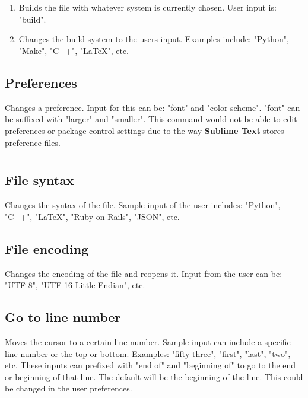 \documentclass[11pt, oneside]{article}
\begin{document}
\section{}

	\begin{enumerate}
	\item {}
	Builds the file with whatever system is currently chosen. User input is: "build".

	\item {}
	Changes the build system to the users input. Examples include: "Python", "Make", "C++", "\LaTeX", etc.
	\end{enumerate}

\subsection{Preferences}
	Changes a preference. Input for this can be: "font" and  "color scheme". "font" can be suffixed with "larger" and "smaller". This command would not be able to edit preferences or package control settings due to the way \textbf{Sublime Text} stores preference files. 

\section{}

	\subsection{File syntax}
	Changes the syntax of the file. Sample input of the user includes: "Python", "C++", "\LaTeX", "Ruby on Rails", "JSON", etc.

	\subsection{File encoding}
	Changes the encoding of the file and reopens it. Input from the user can be: "UTF-8", "UTF-16 Little Endian", etc.

	\subsection{Go to line number}
	Moves the cursor to a certain line number. Sample input can include a specific line number or the top or bottom. Examples: "fifty-three", "first", "last", "two", etc. These inputs can prefixed with "end of" and "beginning of" to go to the end or beginning of that line. The default will be the beginning of the line. This could be changed in the user preferences.
\end{document}
